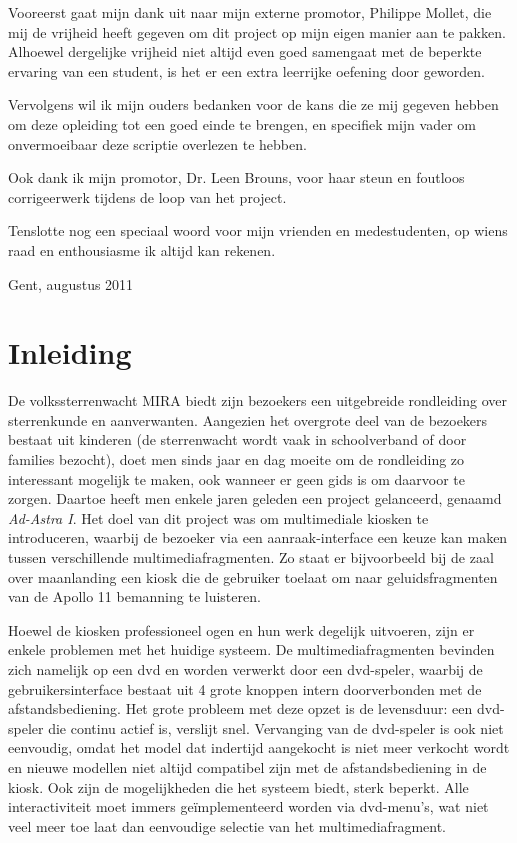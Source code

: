 Vooreerst gaat mijn dank uit naar mijn externe promotor, Philippe Mollet, die mij de vrijheid heeft gegeven om dit project op mijn eigen manier aan te pakken. Alhoewel dergelijke vrijheid niet altijd even goed samengaat met de beperkte ervaring van een student, is het er een extra leerrijke oefening door geworden.

Vervolgens wil ik mijn ouders bedanken voor de kans die ze mij gegeven hebben om deze opleiding tot een goed einde te brengen, en specifiek mijn vader om onvermoeibaar deze scriptie overlezen te hebben.

Ook dank ik mijn promotor, Dr. Leen Brouns, voor haar steun en foutloos corrigeerwerk tijdens de loop van het project.

Tenslotte nog een speciaal woord voor mijn vrienden en medestudenten, op wiens raad en enthousiasme ik altijd kan rekenen.

\begin{flushright}
Gent, augustus 2011
\end{flushright} 

\clearpage


%
%

\chapter{Inleiding}
\label{inleiding}

De volkssterrenwacht MIRA biedt zijn bezoekers een uitgebreide rondleiding over sterrenkunde en aanverwanten. Aangezien het overgrote deel van de bezoekers bestaat uit kinderen (de sterrenwacht wordt vaak in schoolverband of door families bezocht), doet men sinds jaar en dag moeite om de rondleiding zo interessant mogelijk te maken, ook wanneer er geen gids is om daarvoor te zorgen. Daartoe heeft men enkele jaren geleden een project gelanceerd, genaamd \emph{Ad-Astra I}. Het doel van dit project was om multimediale kiosken te introduceren, waarbij de bezoeker via een aanraak-interface een keuze kan maken tussen verschillende multimediafragmenten. Zo staat er bijvoorbeeld bij de zaal over maanlanding een kiosk die de gebruiker toelaat om naar geluidsfragmenten van de Apollo 11 bemanning te luisteren.

Hoewel de kiosken professioneel ogen en hun werk degelijk uitvoeren, zijn er enkele problemen met het huidige systeem. De multimediafragmenten bevinden zich namelijk op een \ac{dvd} en worden verwerkt door een \acs{dvd}-speler, waarbij de gebruikersinterface bestaat uit 4 grote knoppen intern doorverbonden met de afstandsbediening.
Het grote probleem met deze opzet is de levensduur: een \acs{dvd}-speler die continu actief is, verslijt snel. Vervanging van de \acs{dvd}-speler is ook niet eenvoudig, omdat het model dat indertijd aangekocht is niet meer verkocht wordt en nieuwe modellen niet altijd compatibel zijn met de afstandsbediening in de kiosk.
Ook zijn de mogelijkheden die het systeem biedt, sterk beperkt. Alle interactiviteit moet immers geïmplementeerd worden via \acs{dvd}-menu's, wat niet veel meer toe laat dan eenvoudige selectie van het multimediafragment.

